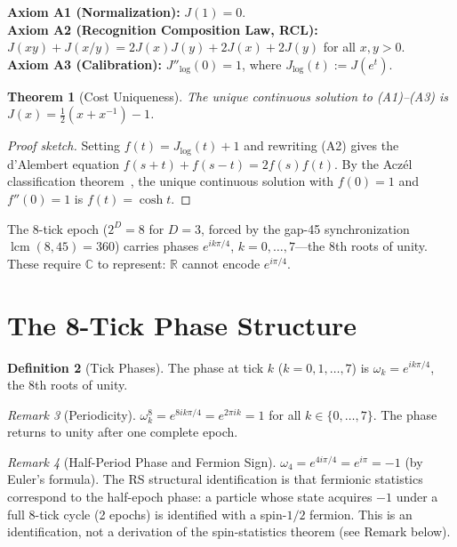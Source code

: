 \documentclass[12pt,a4paper]{article}
\newtheorem{theorem}{Theorem}[section]
\theoremstyle{definition}
\newtheorem{definition}[theorem]{Definition}
\theoremstyle{remark}
\newtheorem{remark}[theorem]{Remark}
\begin{document}
\noindent\textbf{Axiom A1 (Normalization):} $J(1) = 0$.\\
\textbf{Axiom A2 (Recognition Composition Law, RCL):}
$J(xy) + J(x/y) = 2J(x)J(y) + 2J(x) + 2J(y)$ for all $x, y > 0$.\\
\textbf{Axiom A3 (Calibration):} $J''_{\log}(0) = 1$, where
$J_{\log}(t) := J(e^t)$.

\begin{theorem}[Cost Uniqueness]
\label{thm:unique}
The unique continuous solution to \textup{(A1)--(A3)} is
$J(x) = \tfrac{1}{2}(x + x^{-1}) - 1$.
\end{theorem}

\begin{proof}[Proof sketch]
Setting $f(t) = J_{\log}(t) + 1$ and rewriting \textup{(A2)} gives the
d'Alembert equation $f(s+t) + f(s-t) = 2f(s)f(t)$.  By the Acz\'el
classification theorem~\cite{Aczel1966}, the unique continuous solution
with $f(0) = 1$ and $f''(0) = 1$ is $f(t) = \cosh t$.
\end{proof}

\noindent The 8-tick epoch ($2^D = 8$ for $D = 3$, forced by the gap-45
synchronization $\operatorname{lcm}(8,45)=360$) carries phases
$e^{ik\pi/4}$, $k = 0, \ldots, 7$---the 8th roots of unity.  These
require $\mathbb{C}$ to represent: $\mathbb{R}$ cannot encode $e^{i\pi/4}$.

\section{The 8-Tick Phase Structure}

\begin{definition}[Tick Phases]
The phase at tick $k$ ($k = 0, 1, \ldots, 7$) is
$\omega_k = e^{ik\pi/4}$, the 8th roots of unity.
\end{definition}

\begin{remark}[Periodicity]
$\omega_k^8 = e^{8ik\pi/4} = e^{2\pi ik} = 1$ for all $k \in \{0,\ldots,7\}$.
The phase returns to unity after one complete epoch.
\end{remark}

\begin{remark}[Half-Period Phase and Fermion Sign]
$\omega_4 = e^{4i\pi/4} = e^{i\pi} = -1$ (by Euler's formula).  The
RS structural identification is that fermionic statistics correspond
to the half-epoch phase: a particle whose state acquires $-1$ under
a full 8-tick cycle (2 epochs) is identified with a spin-$1/2$ fermion.
This is an identification, not a derivation of the spin-statistics
theorem (see Remark below).
\end{remark}
\end{document}
